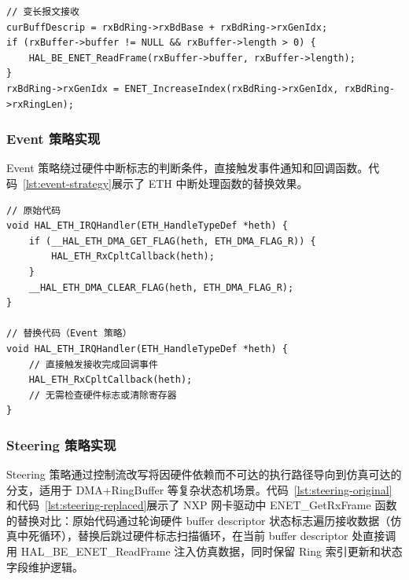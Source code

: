\begin{lstlisting}[style=CStyle,abovecaptionskip=0pt,belowcaptionskip=0pt,caption=Redirect 策略替换示例（变长报文接收）,label=lst:redirect-enet]
// 变长报文接收
curBuffDescrip = rxBdRing->rxBdBase + rxBdRing->rxGenIdx;
if (rxBuffer->buffer != NULL && rxBuffer->length > 0) {
    HAL_BE_ENET_ReadFrame(rxBuffer->buffer, rxBuffer->length);
}
rxBdRing->rxGenIdx = ENET_IncreaseIndex(rxBdRing->rxGenIdx, rxBdRing->rxRingLen);
\end{lstlisting}

\subsubsection{Event 策略实现}

Event 策略绕过硬件中断标志的判断条件，直接触发事件通知和回调函数。代码~\ref{lst:event-strategy}展示了 ETH 中断处理函数的替换效果。

\begin{lstlisting}[style=CStyle,abovecaptionskip=0pt,belowcaptionskip=0pt,caption=Event 策略替换示例,label=lst:event-strategy]
// 原始代码
void HAL_ETH_IRQHandler(ETH_HandleTypeDef *heth) {
    if (__HAL_ETH_DMA_GET_FLAG(heth, ETH_DMA_FLAG_R)) {
        HAL_ETH_RxCpltCallback(heth);
    }
    __HAL_ETH_DMA_CLEAR_FLAG(heth, ETH_DMA_FLAG_R);
}

// 替换代码（Event 策略）
void HAL_ETH_IRQHandler(ETH_HandleTypeDef *heth) {
    // 直接触发接收完成回调事件
    HAL_ETH_RxCpltCallback(heth);
    // 无需检查硬件标志或清除寄存器
}
\end{lstlisting}

\subsubsection{Steering 策略实现}

Steering 策略通过控制流改写将因硬件依赖而不可达的执行路径导向到仿真可达的分支，适用于 DMA+RingBuffer 等复杂状态机场景。代码~\ref{lst:steering-original}和代码~\ref{lst:steering-replaced}展示了 NXP 网卡驱动中 ENET\_GetRxFrame 函数的替换对比：原始代码通过轮询硬件 buffer descriptor 状态标志遍历接收数据（仿真中死循环），替换后跳过硬件标志扫描循环，在当前 buffer descriptor 处直接调用 HAL\_BE\_ENET\_ReadFrame 注入仿真数据，同时保留 Ring 索引更新和状态字段维护逻辑。


